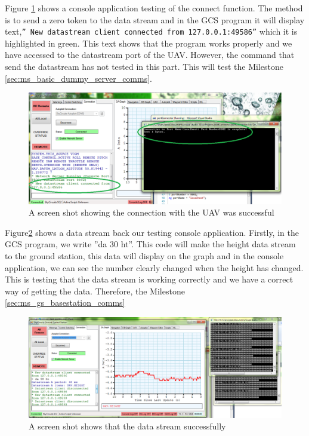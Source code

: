 Figure \ref{connect to Stream Port} shows a console application testing of the connect function. 
The method is to send a zero token to the data stream and in the GCS program it will display text,\texttt{''\* New datastream client connected from 127.0.0.1:49586''} which it is highlighted in green. 
This text shows that the program works properly and we have accessed to the datastream port of the UAV.
However, the command that send the datastream has not tested in this part. 
This will test the Milestone \ref{sec:ms_basic_dummy_server_comms}.
\begin{figure}[H]
\begin{center}
\includegraphics[scale=0.5]{testing_screenshots/test_sending.png} 
\end{center}
\caption{A screen shot showing the connection with the UAV was successful\label{connect to Stream Port}}
\end{figure}


Figure\ref{test screenshot} shows a data stream back our testing console application.
Firstly, in the GCS program, we write ''da 30 ht''. 
This code will make the height data stream to the ground station, this data will display on the graph and in the console application, we can see the number clearly changed when the height has changed.
This is testing that the data stream is working correctly and we have a correct way of getting the data.
Therefore, the Milestone \ref{sec:ms_gs_basestation_comms}
\begin{figure}[H]
\begin{center}
\includegraphics[scale=0.5]{testing_screenshots/test_data.png} 
\end{center}
\caption{A screen shot shows that the data stream successfully\label{test screenshot}}
\end{figure}

